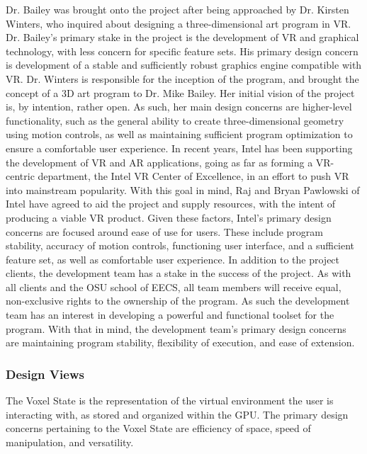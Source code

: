 \documentclass[onecolumn, draftclsnofoot,10pt, compsoc]{IEEEtran}
\newcounter{threesection}[subsubsection]
\begin{document}
Dr. Bailey was brought onto the project after being approached by Dr. Kirsten Winters, who inquired about designing a three-dimensional art program in VR.
Dr. Bailey’s primary stake in the project is the development of VR and graphical technology, with less concern for specific feature sets.
His primary design concern is development of a stable and sufficiently robust graphics engine compatible with VR.
Dr. Winters is responsible for the inception of the program, and brought the concept of a 3D art program to Dr. Mike Bailey.
Her initial vision of the project is, by intention, rather open.
As such, her main design concerns are higher-level functionality, such as the general ability to create three-dimensional geometry using motion controls, as well as maintaining sufficient program optimization to ensure a comfortable user experience.
In recent years, Intel has been supporting the development of VR and AR applications, going as far as forming a VR-centric department, the Intel VR Center of Excellence, in an effort to push VR into mainstream popularity.
With this goal in mind, Raj and Bryan Pawlowski of Intel have agreed to aid the project and supply resources, with the intent of producing a viable VR product.
Given these factors, Intel’s primary design concerns are focused around ease of use for users.
These include program stability, accuracy of motion controls, functioning user interface, and a sufficient feature set, as well as comfortable user experience. 
In addition to the project clients, the development team has a stake in the success of the project.
As with all clients and the OSU school of EECS, all team members will receive equal, non-exclusive rights to the ownership of the program.
As such the development team has an interest in developing a powerful and functional toolset for the program.
With that in mind, the development team’s primary design concerns are maintaining program stability, flexibility of execution, and ease of extension.

\subsubsection{Design Views}


The Voxel State is the representation of the virtual environment the user is interacting with, as stored and organized within the GPU.
The primary design concerns pertaining to the Voxel State are efficiency of space, speed of manipulation, and versatility. 
\end{document}
